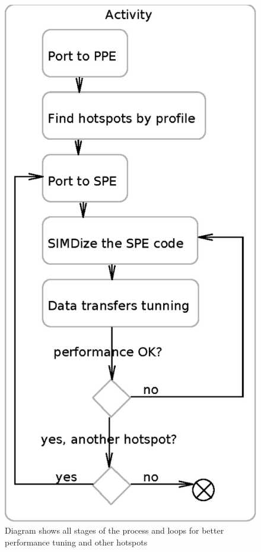 \begin{figure}
    \centering
    \includegraphics[height=\textwidth]{data/portingCycle}
    \caption[Application for Cell B.E. porting process]{Diagram shows all stages of the process and loops for better performance tuning and other hotspots}
    \label{fg:appPorting}
\end{figure}
